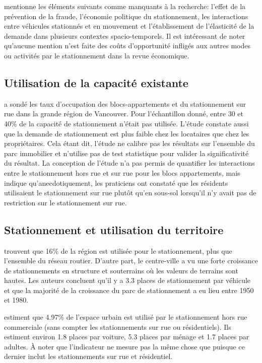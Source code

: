     \textcite{inci_review_2015} mentionne les éléments suivants comme manquants à la recherche: l'effet de la prévention de la fraude, l'économie politique du stationnement, les interactions entre véhicules stationnés et en mouvement et l'établissement de l'élasticité de la demande dans plusieurs contextes spacio-temporels. Il est intéressant de noter qu'aucune mention n'est faite des coûts d'opportunité infligés aux autres modes ou activités par le stationnement dans la revue économique.

  
  \subsection{Utilisation de la capacité existante}
    \textcite{translink_2018_2019} a sondé les taux d'occupation des blocs-appartements et du stationnement sur rue dans la grande région de Vancouver. Pour l'échantillon donné, entre 30 et 40\% de la capacité de stationnement n'était pas utilisée. L'étude constate aussi que la demande de stationnement est plus faible chez les locataires que chez les propriétaires. Cela étant dit, l'étude ne calibre pas les résultats sur l'ensemble du parc immobilier et n'utilise pas de test statistique pour valider la significativité du résultat. La conception de l'étude n'a pas permis de quantifier les interactions entre le stationnement hors rue et sur rue pour les blocs appartements, mais indique qu'anecdotiquement, les praticiens ont constaté que les résidents utilisaient le stationnement sur rue plutôt qu'en sous-sol lorsqu'il n'y avait pas de restriction sur le stationnement sur rue. 

  
  \subsection{Stationnement et utilisation du territoire}
    \textcite{chester_parking_2015} trouvent que 16\% de la région est utilisée pour le stationnement, plus que l'ensemble du réseau routier. D'autre part, le centre-ville a vu une forte croissance de stationnements en structure et souterrains où les valeurs de terrains sont hautes. Les auteurs concluent qu'il y a 3.3 places de stationnement par véhicule et que la majorité de la croissance du parc de stationnement a eu lieu entre 1950 et 1980.\par
    \textcite{davis_estimating_2010} estiment que 4.97\% de l'espace urbain est utilisé par le stationnement hors rue commerciale (sans compter les stationnements sur rue ou résidentiels). Ils estiment environ 1.8 places par voiture, 5.3 places par ménage et 1.7 places par adultes. À noter que l'indicateur ne mesure pas la même chose que \textcite{chester_parking_2015} puisque ce dernier inclut les stationnements sur rue et résidentiel.
